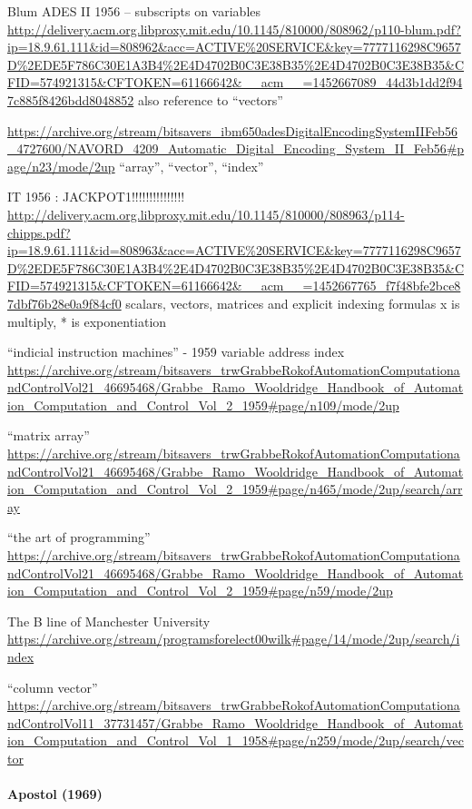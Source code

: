 Blum ADES II 1956 – subscripts on variables
\url{http://delivery.acm.org.libproxy.mit.edu/10.1145/810000/808962/p110-blum.pdf?ip=18.9.61.111&id=808962&acc=ACTIVE%20SERVICE&key=7777116298C9657D%2EDE5F786C30E1A3B4%2E4D4702B0C3E38B35%2E4D4702B0C3E38B35&CFID=574921315&CFTOKEN=61166642&__acm__=1452667089_44d3b1dd2f947c885f8426bdd8048852}
also reference to “vectors”

\url{https://archive.org/stream/bitsavers_ibm650adesDigitalEncodingSystemIIFeb56_4727600/NAVORD_4209_Automatic_Digital_Encoding_System_II_Feb56#page/n23/mode/2up}
“array”, “vector”, “index”

IT 1956 : JACKPOT1!!!!!!!!!!!!!!!
\url{http://delivery.acm.org.libproxy.mit.edu/10.1145/810000/808963/p114-chipps.pdf?ip=18.9.61.111&id=808963&acc=ACTIVE%20SERVICE&key=7777116298C9657D%2EDE5F786C30E1A3B4%2E4D4702B0C3E38B35%2E4D4702B0C3E38B35&CFID=574921315&CFTOKEN=61166642&__acm__=1452667765_f7f48bfe2bce87dbf76b28e0a9f84cf0}
scalars, vectors, matrices  and explicit indexing formulas
x is multiply, * is exponentiation


“indicial instruction machines” - 1959
variable address index
\url{https://archive.org/stream/bitsavers_trwGrabbeRokofAutomationComputationandControlVol21_46695468/Grabbe_Ramo_Wooldridge_Handbook_of_Automation_Computation_and_Control_Vol_2_1959#page/n109/mode/2up}

“matrix array”
\url{https://archive.org/stream/bitsavers_trwGrabbeRokofAutomationComputationandControlVol21_46695468/Grabbe_Ramo_Wooldridge_Handbook_of_Automation_Computation_and_Control_Vol_2_1959#page/n465/mode/2up/search/array}

“the art of programming”
\url{https://archive.org/stream/bitsavers_trwGrabbeRokofAutomationComputationandControlVol21_46695468/Grabbe_Ramo_Wooldridge_Handbook_of_Automation_Computation_and_Control_Vol_2_1959#page/n59/mode/2up}

The B line of Manchester University
\url{https://archive.org/stream/programsforelect00wilk#page/14/mode/2up/search/index}

“column vector”
\url{https://archive.org/stream/bitsavers_trwGrabbeRokofAutomationComputationandControlVol11_37731457/Grabbe_Ramo_Wooldridge_Handbook_of_Automation_Computation_and_Control_Vol_1_1958#page/n259/mode/2up/search/vector}


\paragraph{Apostol (1969)~\cite{Apostol1969}}

